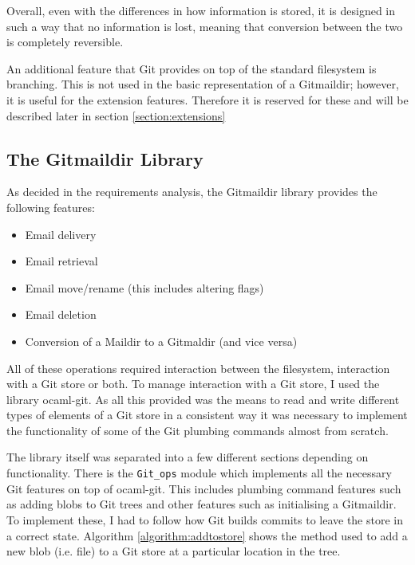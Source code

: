 Overall, even with the differences in how information is stored, it is designed in such a way that no information is lost, meaning that conversion between the two is completely reversible.

An additional feature that Git provides on top of the standard filesystem is branching. This is not used in the basic representation of a Gitmaildir; however, it is useful for the extension features. Therefore it is reserved for these and will be described later in section \ref{section:extensions}

\subsection{The Gitmaildir Library}

As decided in the requirements analysis, the Gitmaildir library provides the following features:

\begin{itemize}
\item Email delivery
\item Email retrieval
\item Email move/rename (this includes altering flags)
\item Email deletion
\item Conversion of a Maildir to a Gitmaldir (and vice versa)
\end{itemize}

All of these operations required interaction between the filesystem, interaction with a Git store or both. To manage interaction with a Git store, I used the library ocaml-git. As all this provided was the means to read and write different types of elements of a Git store in a consistent way it was necessary to implement the functionality of some of the Git plumbing commands almost from scratch.

The library itself was separated into a few different sections depending on functionality. There is the \texttt{Git\_ops} module which implements all the necessary Git features on top of ocaml-git. This includes plumbing command features such as adding blobs to Git trees and other features such as initialising a Gitmaildir. To implement these, I had to follow how Git builds commits to leave the store in a correct state. Algorithm \ref{algorithm:addtostore} shows the method used to add a new blob (i.e. file) to a Git store at a particular location in the tree.

